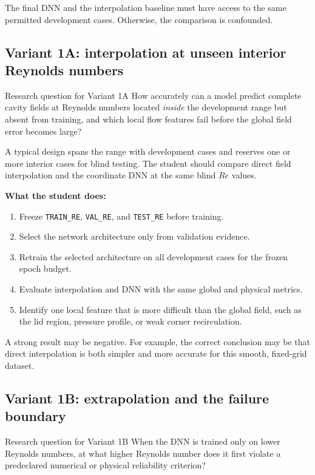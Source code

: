\documentclass[11pt]{article}
\begin{document}
The final DNN and the interpolation baseline must have access to the same permitted development cases. Otherwise, the comparison is confounded.

\subsection{Variant 1A: interpolation at unseen interior Reynolds numbers}
\begin{projectbox}{Research question for Variant 1A}
How accurately can a model predict complete cavity fields at Reynolds numbers located \emph{inside} the development range but absent from training, and which local flow features fail before the global field error becomes large?
\end{projectbox}

A typical design spans the range with development cases and reserves one or more interior cases for blind testing. The student should compare direct field interpolation and the coordinate DNN at the same blind $Re$ values.

\textbf{What the student does:}
\begin{enumerate}
\item Freeze \texttt{TRAIN\_RE}, \texttt{VAL\_RE}, and \texttt{TEST\_RE} before training.
\item Select the network architecture only from validation evidence.
\item Retrain the selected architecture on all development cases for the frozen epoch budget.
\item Evaluate interpolation and DNN with the same global and physical metrics.
\item Identify one local feature that is more difficult than the global field, such as the lid region, pressure profile, or weak corner recirculation.
\end{enumerate}

A strong result may be negative. For example, the correct conclusion may be that direct interpolation is both simpler and more accurate for this smooth, fixed-grid dataset.

\subsection{Variant 1B: extrapolation and the failure boundary}
\begin{projectbox}{Research question for Variant 1B}
When the DNN is trained only on lower Reynolds numbers, at what higher Reynolds number does it first violate a predeclared numerical or physical reliability criterion?
\end{projectbox}
\end{document}
